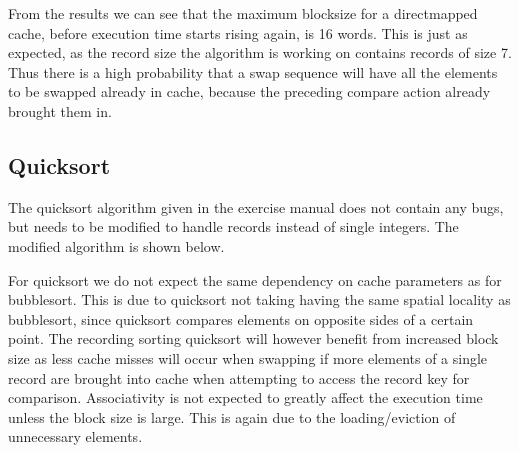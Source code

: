 From the results we can see that the maximum blocksize for a directmapped cache, before execution time starts rising again, is 
16 words. This is just as expected, as the record size the algorithm is working on contains records of size 7.
Thus there is a high probability that a swap sequence will have all the elements to be swapped already in cache,
because the preceding compare action already brought them in.

\subsection{Quicksort}
The quicksort algorithm given in the exercise manual does not contain any bugs, but needs to be modified to handle records instead
of single integers. The modified algorithm is shown below.

For quicksort we do not expect the same dependency on cache parameters as for bubblesort. This is due to quicksort not taking
having the same spatial locality as bubblesort, since quicksort compares elements on opposite sides of a certain point. 
The recording sorting quicksort will however benefit from increased block size as less cache misses will occur when swapping if
more elements of a single record are brought into cache when attempting to access the record key for comparison. Associativity is
not expected to greatly affect the execution time unless the block size is large. This is again due to the loading/eviction of 
unnecessary elements.

